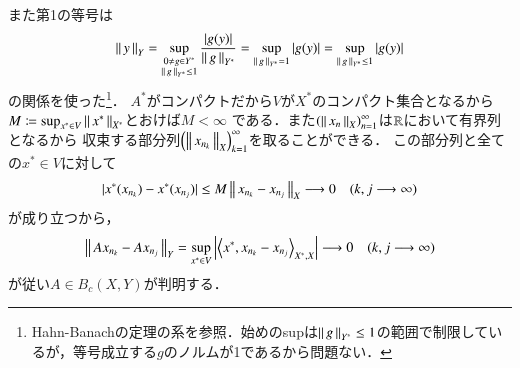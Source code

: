 \begin{prf}
\begin{description}
\begin{description}
						また第1の等号は
						\begin{align}
							\left\|\, y\, \right\|_{Y} = \operatorname*{sup}_{\substack{0 \neq g \in Y^* \\ \left\|\, g\, \right\|_{Y^*}\leq1}} \frac{|g(y)|}{\left\|\, g\, \right\|_{Y^*}} 
							= \operatorname*{sup}_{\left\|\, g\, \right\|_{Y^*}=1} |g(y)| = \operatorname*{sup}_{\left\|\, g\, \right\|_{Y^*} \leq 1} |g(y)|
						\end{align}
						の関係を使った\footnote{Hahn-Banachの定理の系を参照．始めのsupは$\left\|\, g\, \right\|_{Y^*}\leq1$の範囲で制限しているが，等号成立する$g$のノルムが1であるから問題ない．}．
						$A^*$がコンパクトだから$V$が$X^*$のコンパクト集合となるから$M \coloneqq \operatorname*{sup}_{x^* \in V} \left\|\, x^*\, \right\|_{X^*}$とおけば$M < \infty$
						である．また$\left(\left\|\, x_n\, \right\|_{X}\right)_{n=1}^{\infty}$は$\mathbb{R}$において有界列となるから
						収束する部分列$\left(\left\|\, x_{n_k}\, \right\|_{X}\right)_{k=1}^{\infty}$を取ることができる．
						この部分列と全ての$x^* \in V$に対して
						\begin{align}
							|x^*(x_{n_k}) - x^*(x_{n_j})| \leq M\left\|\, x_{n_k} - x_{n_j}\, \right\|_{X} \longrightarrow 0 \quad (k,j \longrightarrow \infty)
						\end{align}
						が成り立つから，
						\begin{align}
							\Norm{Ax_{n_k} - Ax_{n_j}}{Y} = \sup{x^* \in V}{\left|\inprod<x^*,x_{n_k} - x_{n_j}>_{X^*,X}\right|} \longrightarrow 0 \quad (k,j \longrightarrow \infty)
						\end{align}
						が従い$A \in B_c(X,Y)$が判明する．
				\end{description}
				\QED
		\end{description}
	\end{prf}